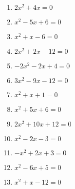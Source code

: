 \documentclass[a4paper,12pt]{article}
\begin{document}
\begin{enumerate}
\begin{enumerate}
      \item $2x^2 + 4x = 0$
      \item $x^2 - 5x + 6 = 0$
      \item $x^2 + x - 6 = 0$
      \item $2x^2 + 2x - 12 = 0$
      \item $- 2x^2 - 2x + 4 = 0$
      \item $3x^2 - 9x - 12 = 0$
      \item $x^2  + x + 1 = 0$
      \item $x^2 + 5x + 6 = 0$
      \item $2x^2 + 10x + 12 = 0$
      \item $x^2 - 2x - 3 = 0$
      \item $-x^2 + 2x + 3 = 0$ 
      \item $x^2 - 6x + 5 = 0$
      \item $x^2 + x - 12 = 0$
    \end{enumerate}


\end{enumerate}
\end{document}
